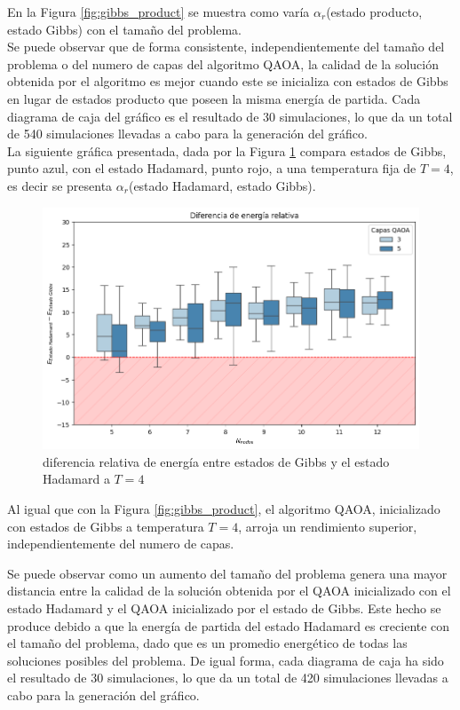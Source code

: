 En la Figura \ref{fig:gibbs_product} se muestra como varía $\alpha_{r}$(estado producto, estado Gibbs) con el tamaño del problema. \\ 

Se puede observar que de forma consistente, independientemente del tamaño del problema o del numero de capas del algoritmo QAOA, la calidad de la solución obtenida por el algoritmo es mejor cuando este se inicializa con estados de Gibbs en lugar de estados producto que poseen la misma energía de partida. Cada diagrama de caja del gráfico es el resultado de 30 simulaciones, lo que da un total de 540 simulaciones llevadas a cabo para la generación del gráfico. \\

La siguiente gráfica presentada, dada por la Figura \ref{fig:gibbs_hadamard_nodes} compara estados de Gibbs,  punto azul, con el estado Hadamard, punto rojo, a una temperatura fija de $T=4$, es decir se presenta $\alpha_{r}$(estado Hadamard, estado Gibbs). 

\begin{figure}[!h]
    \centering
    \includegraphics[scale = 0.7]{plt/06-gibbs_vs_hadamard_nodes.png}
    \caption{diferencia relativa de energía entre estados de Gibbs y el estado Hadamard a $T=4$}
    \label{fig:gibbs_hadamard_nodes}
\end{figure}

Al igual que con la Figura \ref{fig:gibbs_product}, el algoritmo QAOA, inicializado con estados de Gibbs a temperatura $T=4$, arroja un rendimiento superior, independientemente del numero de capas. 

\newpage

Se puede observar como un aumento del tamaño del problema genera una mayor distancia entre la calidad de la solución obtenida por el QAOA inicializado con el estado Hadamard y el QAOA inicializado por el estado de Gibbs. Este hecho se produce debido a que la energía de partida del estado Hadamard es creciente con el tamaño del problema, dado que es un promedio energético de todas las soluciones posibles del problema. De igual forma, cada diagrama de caja ha sido el resultado de 30 simulaciones, lo que da un total de 420 simulaciones llevadas a cabo para la generación del gráfico. \\


